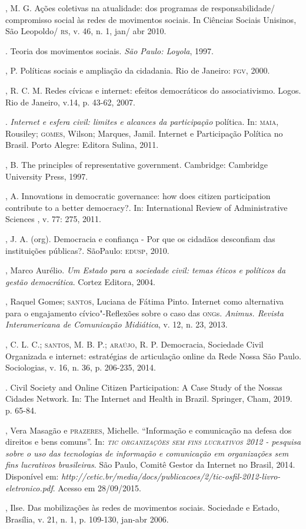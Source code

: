 \begin{bibliohedra}
, M. G. Ações coletivas na atualidade: dos programas de
responsabilidade/ compromisso social às redes de movimentos sociais. In
Ciências Sociais Unisinos, São Leopoldo/ \textsc{rs}, v. 46, n. 1, jan/ abr 2010.

\titidem. Teoria dos movimentos sociais. \emph{São Paulo:
Loyola}, 1997.

, P. Políticas sociais e ampliação da cidadania. Rio de Janeiro:
\textsc{fgv}, 2000.

, R. C. M. Redes cívicas e internet: efeitos democráticos do
associativismo. Logos. Rio de Janeiro, v.14, p. 43-62, 2007.

\titidem. \emph{Internet e esfera civil: limites e alcances da
participação} política. In: \textsc{maia}, Rousiley; \textsc{gomes}, Wilson; Marques,
Jamil. Internet e Participação Política no Brasil. Porto Alegre: Editora
Sulina, 2011.

, B. The principles of representative government. Cambridge:
Cambridge University Press, 1997.

, A. Innovations in democratic governance: how does citizen
participation contribute to a better democracy?. In: International
Review of Administrative Sciences , v. 77: 275, 2011.

, J. A. (org). Democracia e confiança - Por que os cidadãos
desconfiam das instituições públicas?. SãoPaulo: \textsc{edusp}, 2010.

, Marco Aurélio. \emph{Um Estado para a sociedade civil: temas
éticos e políticos da gestão democrática}. Cortez Editora, 2004.

, Raquel Gomes; \textsc{santos}, Luciana de Fátima Pinto. Internet como
alternativa para o engajamento cívico"-Reflexões sobre o caso das \textsc{ong}s.
\emph{Animus. Revista Interamericana de Comunicação Midiática}, v. 12,
n. 23, 2013.

, C. L. C.; \textsc{santos}, M. B. P.; \textsc{araújo}, R. P. Democracia,
Sociedade Civil Organizada e internet: estratégias de articulação online
da Rede Nossa São Paulo. Sociologias, v. 16, n. 36, p. 206-235, 2014.

\titidem. Civil Society and Online Citizen Participation:
A Case Study of the Nossas Cidades Network. In: The Internet and Health
in Brazil. Springer, Cham, 2019. p. 65-84.

, Vera Masagão e \textsc{prazeres}, Michelle. ``Informação e comunicação
na defesa dos direitos e bens comuns''. In: \emph{\textsc{tic organizações sem
fins lucrativos} 2012 - pesquisa sobre o uso das tecnologias de
informação e comunicação em organizações sem fins lucrativos
brasileiras}. São Paulo, Comitê Gestor da Internet no Brasil, 2014.
Disponível em:
\emph{http://cetic.br/media/docs/publicacoes/2/tic-osfil-2012-livro-eletronico.pdf}.
Acesso em 28/09/2015.

, Ilse. Das mobilizações às redes de movimentos sociais.
Sociedade e Estado, Brasília, v. 21, n. 1, p. 109-130, jan-abr 2006.
\end{bibliohedra}

